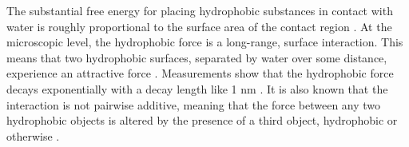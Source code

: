 The substantial free energy for placing hydrophobic substances in contact with water 
is roughly proportional to the surface area of the contact region \cite{Bjorneholm2016}.  
At the microscopic level, the hydrophobic force is a long-range, surface
interaction.  This means that two hydrophobic surfaces, separated by
water over some distance, experience an attractive force
\cite{Lum1999,Meyer2006,Hammer2010}.  Measurements show that the
hydrophobic force decays exponentially with a decay length like 1 nm
\cite{Israelachvili1984, Marcelja1977,Christenson2001,Lin2005}. It is
also known that the interaction is not pairwise additive, meaning that
the force between any two hydrophobic objects is altered by the presence
of a third object, hydrophobic or otherwise \cite{SilveraBatista1242477}. 

